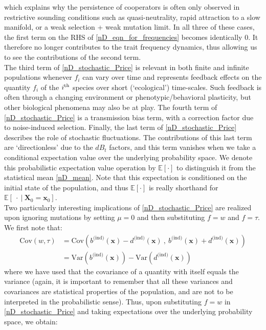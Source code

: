 which explains why the persistence of cooperators is often only observed in restrictive sounding conditions such as quasi-neutrality, rapid attraction to a slow manifold, or a weak selection + weak mutation limit. In all three of these cases, the first term on the RHS of \eqref{nD_eqn_for_frequencies} becomes identically 0. It therefore no longer contributes to the trait frequency dynamics, thus allowing us to see the contributions of the second term.\\
The third term of \eqref{nD_stochastic_Price} is relevant in both finite and infinite populations whenever $f_i$ can vary over time and represents feedback effects on the quantity $f_i$ of the $i\textsuperscript{th}$ species over short (`ecological') time-scales. Such feedback is often through a changing environment or phenotypic/behavioral plasticity, but other biological phenomena may also be at play. The fourth term of \eqref{nD_stochastic_Price} is a transmission bias term, with a correction factor due to noise-induced selection. Finally, the last term of \eqref{nD_stochastic_Price} describes the role of stochastic fluctuations. The contributions of this last term are `directionless' due to the $dB_t$ factors, and this term vanishes when we take a conditional expectation value over the underlying probability space. We denote this probabilistic expectation value operation by $\mathbb{E}[\cdot]$ to distinguish it from the statistical mean \eqref{nD_mean}. Note that this expectation is conditioned on the initial state of the population, and thus $\mathbb{E}[\cdot]$ is really shorthand for $\mathbb{E}[\ \cdot \ | \ \mathbf{X}_0 = \mathbf{x}_0]$.
\\
Two particularly interesting implications of \eqref{nD_stochastic_Price} are realized upon ignoring mutations by setting $\mu = 0$ and then substituting $f=w$ and $f = \tau$. We first note that:
\begin{align}
\textrm{Cov}(w,\tau) &=\textrm{Cov}\left( b^{\textrm{(ind)}}(\mathbf{x}) - d^{\textrm{(ind)}}(\mathbf{x}) \ , \   b^{\textrm{(ind)}}(\mathbf{x}) + d^{\textrm{(ind)}}(\mathbf{x})\right)\\
&= \textrm{Var}(b^{\textrm{(ind)}}(\mathbf{x})) - \textrm{Var}(d^{\textrm{(ind)}}(\mathbf{x}))\label{nD_cross_covariance}
\end{align}
where we have used that the covariance of a quantity with itself equals the variance (again, it is important to remember that all these variances and covariances are statistical properties of the population, and are not to be interpreted in the probabilistic sense). Thus, upon substituting $f = w$ in \eqref{nD_stochastic_Price} and taking expectations over the underlying probability space, we obtain:
